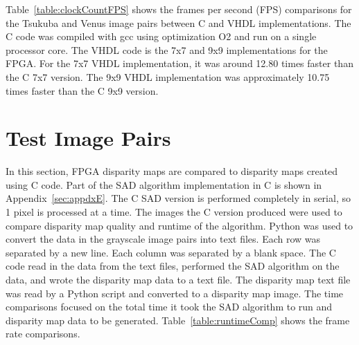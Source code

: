 Table~\ref{table:clockCountFPS} shows the frames per second (FPS) comparisons for the Tsukuba and Venus image pairs between C and VHDL implementations. The C code was compiled with gcc using optimization O2 and run on a single processor core. The VHDL code is the 7x7 and 9x9 implementations for the FPGA. For the 7x7 VHDL implementation, it was around 12.80 times faster than the C 7x7 version. The 9x9 VHDL implementation was approximately 10.75 times faster than the C 9x9 version.

\section{Test Image Pairs}
\label{sec:runtime}

In this section, FPGA disparity maps are compared to disparity maps created using C code. Part of the SAD algorithm implementation in C is shown in Appendix~\ref{sec:appdxE}. The C SAD version is performed completely in serial, so 1 pixel is processed at a time. The images the C version produced were used to compare disparity map quality and runtime of the algorithm. Python was used to convert the data in the grayscale image pairs into text files. Each row was separated by a new line. Each column was separated by a blank space. The C code read in the data from the text files, performed the SAD algorithm on the data, and wrote the disparity map data to a text file. The disparity map text file was read by a Python script and converted to a disparity map image. The time comparisons focused on the total time it took the SAD algorithm to run and disparity map data to be generated. Table~\ref{table:runtimeComp} shows the frame rate comparisons.

